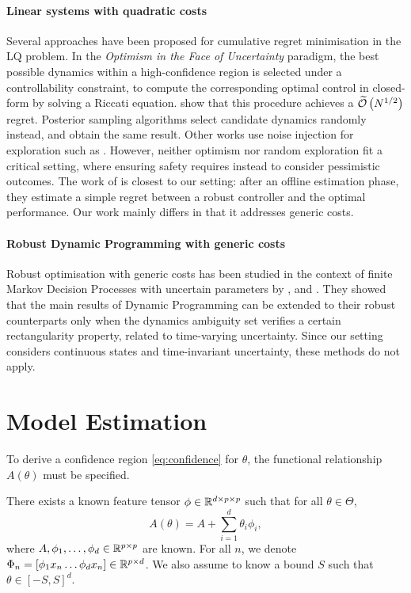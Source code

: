 \documentclass{article}
\begin{document}
\paragraph{Linear systems with quadratic costs} Several approaches have been proposed for cumulative regret minimisation in the LQ problem. In the \emph{Optimism in the Face of Uncertainty} paradigm, the best possible dynamics within a high-confidence region is selected under a controllability constraint, to compute the corresponding optimal control in closed-form by solving a Riccati equation. \citep{abbasi-yadkori11a,Ibrahimi2013,Faradonbeh2017} show that this procedure achieves a $\widetilde{\mathcal{O}}\left(N^{1/2}\right)$ regret. Posterior sampling algorithms \citep{Ouyang2017,abeille18a} select candidate dynamics randomly instead, and obtain the same result. Other works use noise injection for exploration such as \citep{Dean2017,Dean2018}. However, neither optimism nor random exploration fit a critical setting, where ensuring safety requires instead to consider pessimistic outcomes. The work of \citet{Dean2017} is closest to our setting: after an offline estimation phase, they estimate a simple regret between a robust controller and the optimal performance. Our work mainly differs in that it addresses generic costs.

\paragraph{Robust Dynamic Programming with generic costs}
Robust optimisation with generic costs has been studied in the context of finite Markov Decision Processes with uncertain parameters by \citet{Iyengar2005}, \citet{Nilim2005} and \citet{Wiesemann2013}. They showed that the main results of Dynamic Programming can be extended to their robust counterparts only when the dynamics ambiguity set verifies a certain rectangularity property, related to time-varying uncertainty. Since our setting considers continuous states and time-invariant uncertainty, these methods do not apply.

\section{Model Estimation}

\label{sec:estimation}

To derive a confidence region \eqref{eq:confidence} for $\theta$, the functional relationship $A(\theta)$ must be specified.
\begin{assumption}[Structure]
\label{assumpt:structure}
There exists a known feature tensor $\phi\in \mathbb{R}^{d \times p \times p}$ such that for all $\theta\in\Theta$,
\begin{equation}
    A(\theta) = A + %
    \sum_{i=1}^d \theta_i\phi_i,
\end{equation}
where $A,\phi_1,\dots,\phi_d\in\mathbb{R}^{p\times p}$ are known. For all $n$, we denote $\Phi_n = [\phi_1 x_n \dots \phi_d x_n]\in\mathbb{R}^{p\times d}$.
We also assume to know a bound $S$ such that $\theta\in[-S,S]^d$.
\end{assumption}
\end{document}
